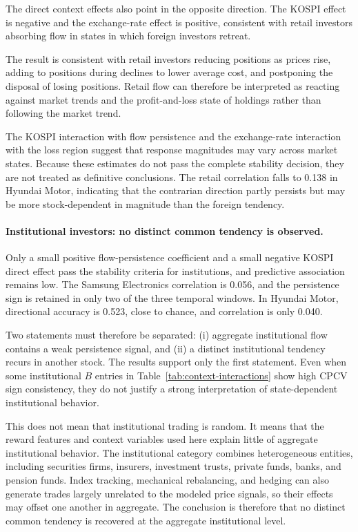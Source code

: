 \documentclass[sigconf,anonymous,review]{acmart}
\begin{document}
The direct context effects also point in the opposite direction. The KOSPI effect is negative and the exchange-rate effect is positive, consistent with retail investors absorbing flow in states in which foreign investors retreat.

The result is consistent with retail investors reducing positions as prices rise, adding to positions during declines to lower average cost, and postponing the disposal of losing positions. Retail flow can therefore be interpreted as reacting against market trends and the profit-and-loss state of holdings rather than following the market trend.

The KOSPI interaction with flow persistence and the exchange-rate interaction with the loss region suggest that response magnitudes may vary across market states. Because these estimates do not pass the complete stability decision, they are not treated as definitive conclusions. The retail correlation falls to 0.138 in Hyundai Motor, indicating that the contrarian direction partly persists but may be more stock-dependent in magnitude than the foreign tendency.

\paragraph{Institutional investors: no distinct common tendency is observed.}
Only a small positive flow-persistence coefficient and a small negative KOSPI direct effect pass the stability criteria for institutions, and predictive association remains low. The Samsung Electronics correlation is 0.056, and the persistence sign is retained in only two of the three temporal windows. In Hyundai Motor, directional accuracy is 0.523, close to chance, and correlation is only 0.040.

Two statements must therefore be separated: (i) aggregate institutional flow contains a weak persistence signal, and (ii) a distinct institutional tendency recurs in another stock. The results support only the first statement. Even when some institutional $B$ entries in Table~\ref{tab:context-interactions} show high CPCV sign consistency, they do not justify a strong interpretation of state-dependent institutional behavior.

This does not mean that institutional trading is random. It means that the reward features and context variables used here explain little of aggregate institutional behavior. The institutional category combines heterogeneous entities, including securities firms, insurers, investment trusts, private funds, banks, and pension funds. Index tracking, mechanical rebalancing, and hedging can also generate trades largely unrelated to the modeled price signals, so their effects may offset one another in aggregate. The conclusion is therefore that no distinct common tendency is recovered at the aggregate institutional level.
\end{document}
